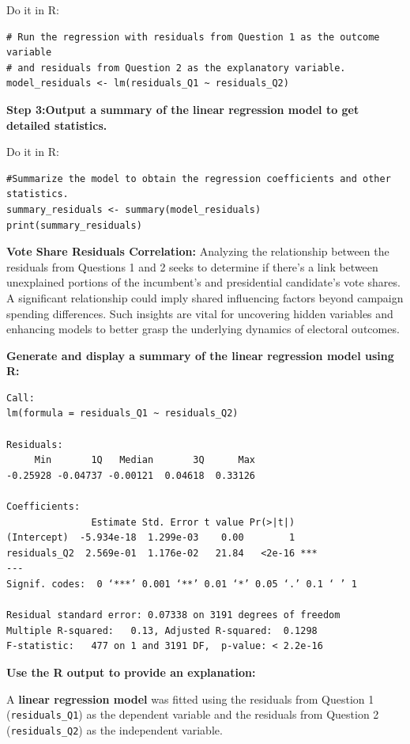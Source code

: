 \documentclass[12pt]{article}
\begin{document}
Do it in R:
\begin{lstlisting}
# Run the regression with residuals from Question 1 as the outcome variable
# and residuals from Question 2 as the explanatory variable.
model_residuals <- lm(residuals_Q1 ~ residuals_Q2)
\end{lstlisting}
\textbf{Step 3:Output a summary of the linear regression model to get detailed statistics.}

Do it in R:
\begin{lstlisting}
#Summarize the model to obtain the regression coefficients and other statistics.
summary_residuals <- summary(model_residuals)
print(summary_residuals)
\end{lstlisting}
\textbf{Vote Share Residuals Correlation:}
Analyzing the relationship between the residuals from Questions 1 and 2 seeks to determine if there's a link between unexplained portions of the incumbent's and presidential candidate's vote shares. A significant relationship could imply shared influencing factors beyond campaign spending differences. Such insights are vital for uncovering hidden variables and enhancing models to better grasp the underlying dynamics of electoral outcomes.

\textbf{Generate and display a summary of the linear regression model using R:}
\begin{center}
\begin{BVerbatim}
Call:
lm(formula = residuals_Q1 ~ residuals_Q2)

Residuals:
     Min       1Q   Median       3Q      Max 
-0.25928 -0.04737 -0.00121  0.04618  0.33126 

Coefficients:
               Estimate Std. Error t value Pr(>|t|)    
(Intercept)  -5.934e-18  1.299e-03    0.00        1    
residuals_Q2  2.569e-01  1.176e-02   21.84   <2e-16 ***
---
Signif. codes:  0 ‘***’ 0.001 ‘**’ 0.01 ‘*’ 0.05 ‘.’ 0.1 ‘ ’ 1

Residual standard error: 0.07338 on 3191 degrees of freedom
Multiple R-squared:   0.13,	Adjusted R-squared:  0.1298 
F-statistic:   477 on 1 and 3191 DF,  p-value: < 2.2e-16   
\end{BVerbatim}
\end{center}


\textbf{Use the R output to provide an explanation:}

A \textbf{linear regression model} was fitted using the residuals from Question 1 (\texttt{residuals\_Q1}) as the dependent variable and the residuals from Question 2 (\texttt{residuals\_Q2}) as the independent variable.
\end{document}
